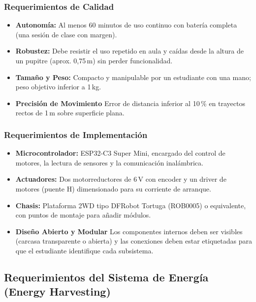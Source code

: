 \documentclass[11pt]{article}
\begin{document}
\subsubsection{Requerimientos de Calidad}
\begin{itemize}
  \item \textbf{Autonomía:} Al menos 60 minutos de uso continuo con batería completa (una sesión de clase con margen).
  \item \textbf{Robustez:} Debe resistir el uso repetido en aula y caídas desde la altura de un pupitre (aprox. 0,75\,m) sin perder funcionalidad.
  \item \textbf{Tamaño y Peso:} Compacto y manipulable por un estudiante con una mano; peso objetivo inferior a 1\,kg.
  \item \textbf{Precisión de Movimiento}  Error de distancia inferior al 10\,\% en trayectos rectos de 1\,m sobre superficie plana.
\end{itemize}
 
\subsubsection{Requerimientos de Implementación}
\begin{itemize}
  \item \textbf{Microcontrolador:} ESP32-C3 Super Mini, encargado del control de motores, la lectura de sensores y la comunicación inalámbrica.
  \item \textbf{Actuadores:} Dos motorreductores de 6\,V con encoder y un driver de motores (puente H) dimensionado para su corriente de arranque.
  \item \textbf{Chasis:} Plataforma 2WD tipo DFRobot Tortuga (ROB0005) o equivalente, con puntos de montaje para añadir módulos.
  \item \textbf{Diseño Abierto y Modular}  Los componentes internos deben ser visibles (carcasa transparente o abierta) y las conexiones deben estar etiquetadas para que el estudiante identifique cada subsistema.
\end{itemize}
 

\subsection{Requerimientos del Sistema de Energía (Energy Harvesting)}
 
\end{document}
